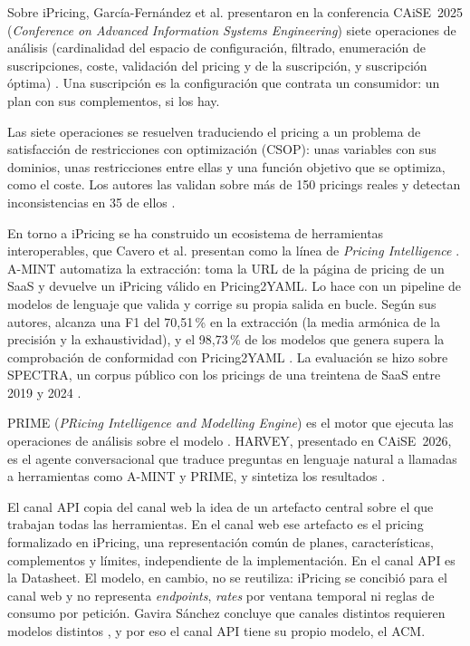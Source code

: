Sobre iPricing, García-Fernández et al. presentaron en la conferencia
CAiSE~2025 (\textit{Conference on Advanced Information Systems
Engineering}) siete operaciones de análisis (cardinalidad del espacio de
configuración, filtrado, enumeración de suscripciones, coste, validación
del pricing y de la suscripción, y suscripción óptima)
\citep{garciafernandez2025ipricing}. Una suscripción es la configuración
que contrata un consumidor: un plan con sus complementos, si los hay.

Las siete operaciones se resuelven traduciendo el pricing a un problema
de satisfacción de restricciones con optimización (CSOP): unas variables
con sus dominios, unas restricciones entre ellas y una función objetivo
que se optimiza, como el coste. Los autores las validan sobre más de 150
pricings reales y detectan inconsistencias en 35 de ellos
\citep{garciafernandez2025ipricing}.

En torno a iPricing se ha construido un ecosistema de herramientas
interoperables, que Cavero et al. presentan como la línea de
\textit{Pricing Intelligence} \citep{cavero2026pricingintelligence}. A-MINT automatiza
la extracción: toma la URL de la página de pricing de un SaaS y devuelve
un iPricing válido en Pricing2YAML. Lo hace con un pipeline de modelos de
lenguaje que valida y corrige su propia salida en bucle. Según sus
autores, alcanza una F1 del 70,51\,\% en la extracción (la media armónica
de la precisión y la exhaustividad), y el 98,73\,\% de los modelos que
genera supera la comprobación de conformidad con Pricing2YAML
\citep{cavero2025amint}. La evaluación se hizo sobre SPECTRA, un
corpus público con los pricings de una treintena de SaaS entre 2019 y
2024 \citep{spectra2025}.

PRIME (\textit{PRicing Intelligence and Modelling Engine}) es el motor
que ejecuta las operaciones de análisis sobre el modelo
\citep{garciafernandez2025ipricing}. HARVEY, presentado en CAiSE~2026,
es el agente conversacional que traduce preguntas en lenguaje natural a
llamadas a herramientas como A-MINT y PRIME, y sintetiza los resultados
\citep{cavero2026pricingintelligence}.

El canal API copia del canal web la idea de un artefacto central sobre el
que trabajan todas las herramientas. En el canal web ese artefacto es el
pricing formalizado en iPricing, una representación común de planes,
características, complementos y límites, independiente de la
implementación. En el canal API es la Datasheet. El modelo, en cambio, no
se reutiliza: iPricing se concibió para el canal web y no representa
\textit{endpoints}, \textit{rates} por ventana temporal ni reglas de
consumo por petición. Gavira Sánchez concluye que canales distintos
requieren modelos distintos \citep{gavira2026tfm}, y por eso el canal API
tiene su propio modelo, el ACM.


